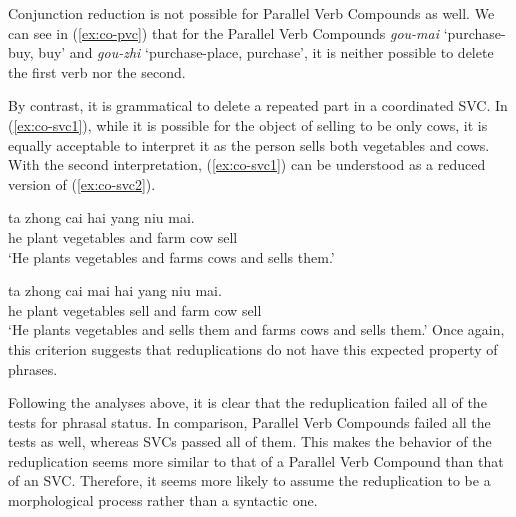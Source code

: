 Conjunction reduction is not possible for Parallel Verb Compounds as well.
We can see in (\ref{ex:co-pvc}) that for the Parallel Verb Compounds \textit{gou-mai} `purchase-buy, buy' and \textit{gou\hyp{}zhi} `purchase\hyp{}place, purchase', it is neither possible to delete the first verb nor the second.

\ea\label{ex:co-pvc}
    
    \z
\z

By contrast, it is grammatical to delete a repeated part in a coordinated {SVC}. 
In (\ref{ex:co-svc1}), while it is possible for the object of selling to be only cows, it is equally acceptable to interpret it as the person sells both vegetables and cows. With the second interpretation, (\ref{ex:co-svc1}) can be understood as a reduced version of (\ref{ex:co-svc2}).

\ea
  \ea\label{ex:co-svc1}
  \gll ta zhong cai hai yang niu mai.\\
  he plant vegetables and farm cow sell\\
  \glt `He plants vegetables and farms cows and sells them.'
  
  \ex\label{ex:co-svc2}
  \gll ta zhong cai mai hai yang niu mai.\\
  he plant vegetables sell and farm cow sell\\
  \glt `He plants vegetables and sells them and farms cows and sells them.'
   \z
\z
Once again, this criterion suggests that reduplications do not have this expected property of phrases.


Following the analyses above, it is clear that the reduplication failed all of the tests for phrasal status. 
In comparison, Parallel Verb Compounds failed all the tests as well, whereas {SVC}s passed all of them.
This makes the behavior of the reduplication seems more similar to that of a Parallel Verb Compound than that of an {SVC}.
Therefore, it seems more likely to assume the reduplication to be a morphological process rather than a syntactic one. 




